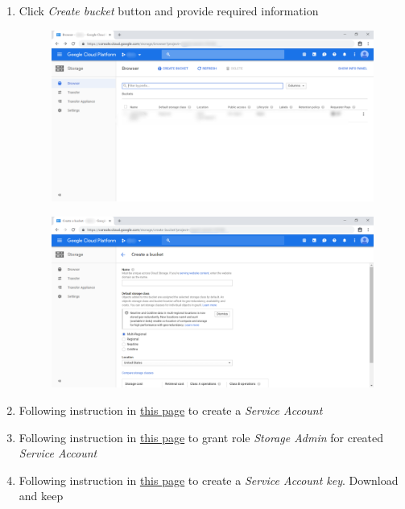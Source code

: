 \begin{enumerate}
\begin{center}
\begin{figure}[H]
	      	\end{figure}
	      \end{center}
	\item Click \textit{Create bucket} button and provide required information
	      \begin{center}
	      	\begin{figure}[H]
	      		\centering
	      		\includegraphics[width=0.6\columnwidth]{images/appendixA/GCP-Storage.PNG}
	      	\end{figure}
	      	\begin{figure}[H]
	      		\centering
	      		\includegraphics[width=0.6\columnwidth]{images/appendixA/GCP-Storage-create-bucket.PNG}
	      	\end{figure}
	      \end{center}
	\item Following instruction in \href{https://cloud.google.com/iam/docs/creating-managing-service-accounts#creating_a_service_account}{this page} to create a \textit{Service Account} 
	\item Following instruction in \href{https://cloud.google.com/iam/docs/granting-roles-to-service-accounts#granting_access_to_a_service_account_for_a_resource}{this page} to grant role \textit{Storage Admin} for created \textit{Service Account}
	\item Following instruction in \href{https://cloud.google.com/iam/docs/creating-managing-service-account-keys#creating_service_account_keys}{this page} to create a \textit{Service Account key}. Download and keep 
\end{enumerate}

